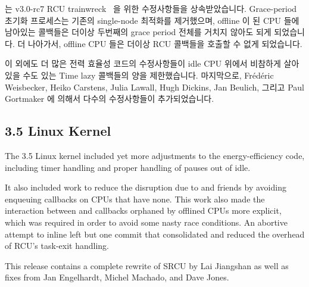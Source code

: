  는 v3.0-rc7 RCU
trainwreck~\cite{PaulEMcKenney2011RCU3.0trainwreck} 을 위한 
수정사항들을 상속받았습니다.
Grace-period 초기화 프로세스는 기존의 single-node 최적화를 제거했으며, offline
이 된 CPU 들에 남아있는 콜백들은 더이상 두번째의 grace period 전체를 거치지
않아도 되게 되었습니다.
더 나아가서, offline CPU 들은 더이상 RCU 콜백들을 호출할 수 없게 되었습니다.

이 외에도 더 많은 전력 효율성 코드의 수정사항들이 idle CPU 위에서 비참하게
살아있을 수도 있는 Time lazy 콜백들의 양을 제한했습니다.
마지막으로, Fr\'ed\'eric Weisbecker, Heiko Carstens, Julia Lawall, Hugh
Dickins, Jan Beulich, 그리고 Paul Gortmaker 에 의해서 다수의 수정사항들이
추가되었습니다.

\subsection{3.5 Linux Kernel}

The 3.5 Linux kernel included yet more adjustments to the
 energy-efficiency code, including timer
handling and proper handling of  pauses out of
idle.

It also included work to reduce the disruption due to 
and friends by avoiding enqueuing callbacks on CPUs that have none.
This work also made the interaction between  and
callbacks orphaned by offlined CPUs more explicit, which was required
in order to avoid some nasty race conditions.
An abortive attempt to inline  left but one
commit that consolidated and reduced the overhead of RCU's
task-exit handling.

This release contains a complete rewrite of SRCU by Lai Jiangshan as
well as fixes from Jan Engelhardt, Michel Machado, and Dave Jones.

